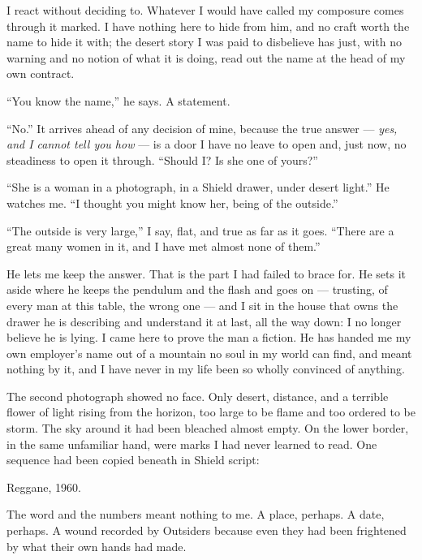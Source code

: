 I react without deciding to. Whatever I would have called my composure comes through it marked. I have nothing here to hide from him, and no craft worth the name to hide it with; the desert story I was paid to disbelieve has just, with no warning and no notion of what it is doing, read out the name at the head of my own contract.\par

``You know the name,'' he says. A statement.\par

``No.'' It arrives ahead of any decision of mine, because the true answer --- \textit{yes, and I cannot tell you how} --- is a door I have no leave to open and, just now, no steadiness to open it through. ``Should I? Is she one of yours?''\par

``She is a woman in a photograph, in a Shield drawer, under desert light.'' He watches me. ``I thought you might know her, being of the outside.''\par

``The outside is very large,'' I say, flat, and true as far as it goes. ``There are a great many women in it, and I have met almost none of them.''\par

He lets me keep the answer. That is the part I had failed to brace for. He sets it aside where he keeps the pendulum and the flash and goes on --- trusting, of every man at this table, the wrong one --- and I sit in the house that owns the drawer he is describing and understand it at last, all the way down: I no longer believe he is lying. I came here to prove the man a fiction. He has handed me my own employer's name out of a mountain no soul in my world can find, and meant nothing by it, and I have never in my life been so wholly convinced of anything.\par

\ornament


The second photograph showed no face. Only desert, distance, and a terrible flower of light rising from the horizon, too large to be flame and too ordered to be storm. The sky around it had been bleached almost empty. On the lower border, in the same unfamiliar hand, were marks I had never learned to read. One sequence had been copied beneath in Shield script:\par

Reggane, 1960.\par

The word and the numbers meant nothing to me. A place, perhaps. A date, perhaps. A wound recorded by Outsiders because even they had been frightened by what their own hands had made.\par

